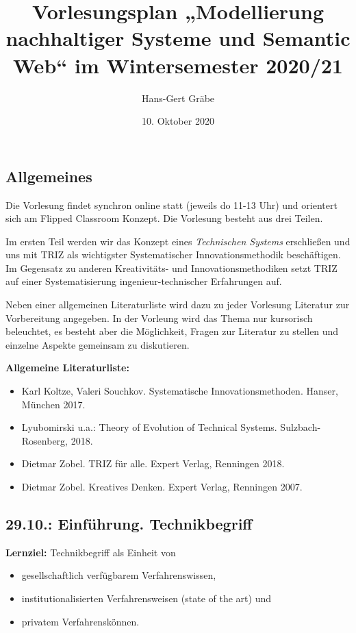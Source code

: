 \documentclass[11pt,a4paper]{article}
\title{Vorlesungsplan „Modellierung nachhaltiger Systeme und Semantic Web“ im
  Wintersemester 2020/21}
\author{Hans-Gert Gr\"abe}
\date{10. Oktober 2020}
\begin{document}
\maketitle
\subsection{Allgemeines}

Die Vorlesung findet synchron online statt (jeweils do 11-13 Uhr) und
orientert sich am Flipped Classroom Konzept. Die Vorlesung besteht aus drei
Teilen.

Im ersten Teil werden wir das Konzept eines \emph{Technischen Systems}
erschließen und uns mit TRIZ als wichtigster Systematischer
Innovationsmethodik beschäftigen.  Im Gegensatz zu anderen Kreativitäts- und
Innovationsmethodiken setzt TRIZ auf einer Systematisierung
ingenieur-technischer Erfahrungen auf.   


Neben einer allgemeinen
Literaturliste wird dazu zu jeder Vorlesung Literatur zur Vorbereitung
angegeben. In der Vorleung wird das Thema nur kursorisch beleuchtet, es
besteht aber die Möglichkeit, Fragen zur Literatur zu stellen und einzelne
Aspekte gemeinsam zu diskutieren.

\textbf{Allgemeine Literaturliste:}
\begin{itemize}[noitemsep]
\item Karl Koltze, Valeri Souchkov. Systematische Innovationsmethoden. Hanser,
  München 2017.
\item Lyubomirski u.a.: Theory of Evolution of Technical Systems.
  Sulzbach-Rosenberg, 2018.
\item Dietmar Zobel. TRIZ für alle. Expert Verlag, Renningen 2018.
\item Dietmar Zobel. Kreatives Denken. Expert Verlag, Renningen 2007.
\end{itemize}
\newpage
\tableofcontents
\newpage
\subsection{29.10.: Einführung. Technikbegriff}

\textbf{Lernziel:}
Technikbegriff als Einheit von 
\begin{itemize}[noitemsep]
\item gesellschaftlich verfügbarem Verfahrenswissen,
\item institutionalisierten Verfahrensweisen (state of the art) und
\item privatem Verfahrenskönnen.
\end{itemize}
\end{document}
